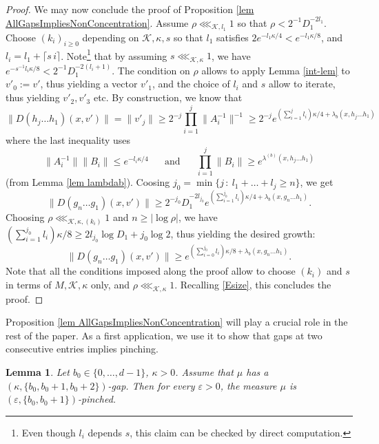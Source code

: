 \documentclass[11pt, leqno, fleqn]{amsart}
\def\eps{\varepsilon}
\newcommand{\cK}{{\mathcal K}}
\newtheorem{lemma}[thm]{\bf Lemma}
\theoremstyle{definition}
\theoremstyle{definition}
\begin{document}
\begin{proof}
We may now conclude the proof of Proposition \ref{lem AllGapsImpliesNonConcentration}. Assume $\rho\lll_{\cK, l_{1}}1$ so that $\rho< 2^{-1}D_{1}^{-2l_{1}}$. 
Choose $(k_{i})_{i\geq 0}$ depending on $\cK, \kappa, s$ so that $l_{1}$ satisfies $2e^{-l_{1}\kappa/4} < e^{-l_{1}\kappa/8}$, and $l_{i}=l_{1}+ \lceil s \,i\rceil$. Note\footnote{Even though $l_{i}$ depends $s$, this claim can be checked  by direct computation.} that by assuming $s\lll_{\cK, \kappa}1$, we have  $e^{-s^{-1} l_{i}\kappa/8}< 2^{-1}D_{1}^{-2(l_{i}+1)}$. The  condition on $\rho$  allows to apply Lemma \ref{int-lem} to $v'_{0}:=v'$, thus yielding a vector $v'_{1}$, and the choice of $l_{i}$ and $s$ allow to iterate, thus yielding $v'_{2}, v'_{3}$ etc. 
By   construction, we know that 
$$\|D(h_{j}\dots h_{1})(x,v')\| = \|v'_{j}\| \geq 2^{-j} \prod_{i=1}^j \|A_{i}^{-1}\|^{-1} \geq 2^{-j} e^{(\sum_{i=1}^j l_{i})\kappa/4 + \lambda_{b}(x, h_{j}\dots h_{1})}$$
where the last inequality uses 
$$\| A_i^{-1} \| \| B_i \| \leq e^{ - l_{i} \kappa / 4} \quad\,\,\text{ and } 	\,\,\quad	 \prod_{i = 1}^{j}  \| B_i \| \geq e^{\lambda^{(b)}(x, h_{j}\dots h_{1} )}$$
(from Lemma \ref{lem lambdab}). Coosing $j_{0}=\min \{j \,:\ l_{1}+\dots+l_{j}\geq n\}$, we get  
$$\|D(g_{n}\dots g_{1})(x,v')\|  \geq 2^{-j_{0}} D_{1}^{-2l_{j_{0}}}e^{(\sum_{i=1}^{j_{0}} l_{i})\kappa/4 + \lambda_{b}(x, g_{n}\dots h_{1})}.$$ 
	Choosing $\rho\lll_{\cK, \kappa, (k_{i})}1$ and $n\geq |\log \rho|$, we have $(\sum_{i=1}^{j_{0}} l_{i})\kappa/8 \geq 2l_{j_{0}}\log D_{1}+j_{0}\log 2$, thus yielding the desired growth:
	$$\|D(g_{n}\dots g_{1})(x,v')\|  \geq e^{(\sum_{i=0}^{j_{0}} l_{i})\kappa/8 + \lambda_{b}(x, g_{n}\dots h_{1})}.$$ 
Note that all the conditions imposed along the proof allow to choose $(k_{i})$ and $s$ in terms of $M,\cK,\kappa$ only, and $\rho\lll_{\cK, \kappa}1$. 
Recalling \eqref{Esize}, this concludes the proof.
		 \end{proof}
	
	


		 
		 Proposition \ref{lem AllGapsImpliesNonConcentration} will play a crucial role in the rest of the paper.
As a first application, we use it to show that gaps at two consecutive entries implies pinching.
\begin{lemma} \label{rem allgapstopinch}	Let $  b_0 \in \{0,\dots,  d-1\}$, $\kappa > 0$. 
	Assume that $\mu$ has  a $(\kappa, \{b_0, b_{0}+1,  b_{0}+2\})$-gap. 
	Then  	for every $\eps > 0$,  the measure $\mu$ is $(\eps, \{ b_0, b_0 + 1 \})$-pinched.
\end{lemma}
\end{document}
